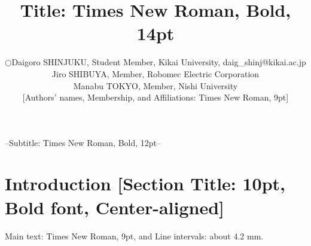 \documentclass[a4paper]{article}
\begin{document}
\makeatletter
\title{Title: Times New Roman, Bold, 14pt}
{--Subtitle: Times New Roman, Bold, 12pt--}%
{}%
{}%

\author{ \small
\begin{tabular}{ll}
 $\bigcirc$ & Daigoro SHINJUKU, Student Member,  Kikai University, daig\_shinj@kikai.ac.jp\\%
  & Jiro SHIBUYA, Member, Robomec Electric Corporation\\
  & Manabu TOKYO, Member, Nishi University\\
  & [Authors' names, Membership, and Affiliations: Times New Roman, 9pt]
\end{tabular}
}
\makeatother



\date{} %

\maketitle
\thispagestyle{empty}
\pagestyle{empty}

\small
\section{Introduction [Section Title: 10pt, \protect\\ Bold font, Center-aligned]}%
Main text: Times New Roman, 9pt, and Line intervals: about 4.2 mm.
\end{document}
